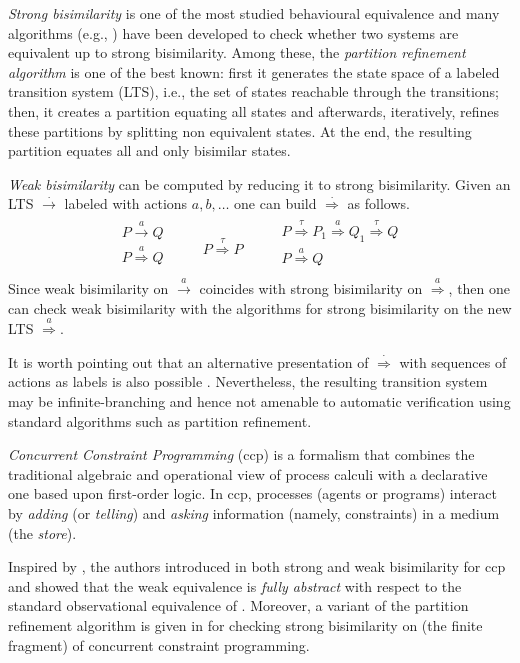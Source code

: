 \documentclass[copyright,creativecommons]{eptcs}
\newcommand{\rrarrow}{\longrightarrow}
\newcommand{\trans}[1]{\stackrel{#1}{\rrarrow}}
\newcommand{\tr}[1]{\trans{#1}}
\newcommand{\bigfrac}[2]{
\begin{array}{c}#1\\
\hline #2
\end{array}}
\newcommand{\newtrans}[1]{\stackrel{#1}{\Longrightarrow}}
\begin{document}
\emph{Strong bisimilarity} is one of the most studied behavioural equivalence and many algorithms (e.g., \cite{Victor:94:CAV,Fernandez:89:SCP,Ferrari:98:CAV})
have been developed to check whether two systems are equivalent up to strong bisimilarity.
Among these, the \emph{partition refinement algorithm}
\cite{Kanellakis:83:PODC} is one of the best known: first it generates the
state space of a labeled transition system (LTS), i.e., the set of states reachable through the transitions; then,
it creates a partition equating all states and afterwards,
iteratively, refines these partitions by splitting non equivalent
states. At the end, the resulting partition equates all and only  bisimilar states.

\emph{Weak bisimilarity} can be computed by reducing it to strong bisimilarity.
Given an LTS $\trans{\cdot}$ labeled with actions $a,b,\ldots$ one can build $\newtrans{\cdot}$ as follows.
\[\begin{array}{c}
 \bigfrac{P \trans{a}Q}{P \newtrans{a} Q} \qquad
 \bigfrac{}{P \newtrans{\tau} P} \qquad
 \bigfrac{P \newtrans{\tau} P_1 \newtrans{a} Q_1 \newtrans{\tau} Q}{P \newtrans{a} Q} \\
\end{array}\]
Since weak bisimilarity on $\tr{a}$ coincides with strong bisimilarity on $\newtrans{a}$, then one can check weak bisimilarity
with the algorithms for strong bisimilarity on the new LTS $\newtrans{a}$.

It is worth pointing out  that an alternative presentation of $\newtrans{\cdot}$ with sequences of actions as labels is also possible \cite{Milner:80:Book}. Nevertheless, the resulting transition system may be infinite-branching and hence not amenable to automatic verification using standard algorithms such as partition refinement.


\emph{Concurrent Constraint Programming} (ccp)
\cite{Saraswat:90:POPL} is a formalism that
combines the traditional algebraic and operational view of process
calculi with a declarative one based upon first-order logic. In ccp,
processes (agents or programs) interact by \emph{adding} (or \emph{telling}) and \emph{asking} information
(namely, constraints) in a medium (the \emph{store}).

Inspired by \cite{Bonchi:06:LICS,Bonchi:09:FOSSACS}, the authors introduced in \cite{Aristizabal:11:FOSSACS}
both strong and weak bisimilarity for ccp and showed that the
weak equivalence is \emph{fully abstract} with respect to the standard observational equivalence of \cite{Saraswat:91:POPL}.
Moreover, a variant of the partition refinement algorithm is given in \cite{Aristizabal:12:SAC} for checking
strong bisimilarity on (the finite fragment) of concurrent constraint programming.
\end{document}
